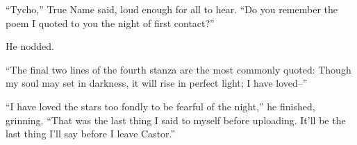 ``Tycho,'' True Name said, loud enough for all to hear. ``Do you remember the poem I quoted to you the night of first contact?''

He nodded.

``The final two lines of the fourth stanza are the most commonly quoted: Though my soul may set in darkness, it will rise in perfect light; I have loved--''

``I have loved the stars too fondly to be fearful of the night,'' he finished, grinning. ``That was the last thing I said to myself before uploading. It'll be the last thing I'll say before I leave Castor.''
